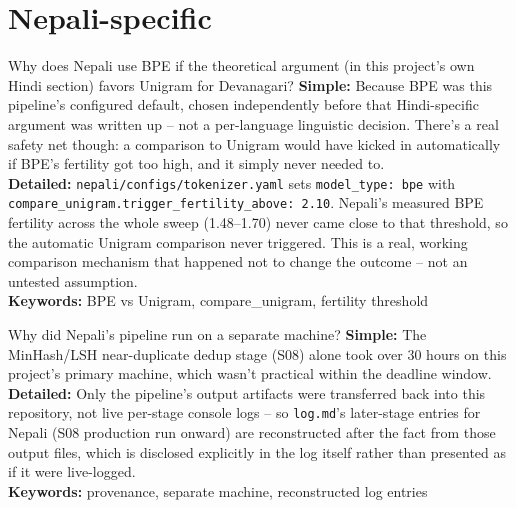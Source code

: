 \documentclass[11pt]{report}
\begin{document}
\section{Nepali-specific}

\begin{qabox}{Why does Nepali use BPE if the theoretical argument (in this
project's own Hindi section) favors Unigram for Devanagari?}
\textbf{Simple:} Because BPE was this pipeline's configured default,
chosen independently before that Hindi-specific argument was written up
-- not a per-language linguistic decision. There's a real safety net
though: a comparison to Unigram would have kicked in automatically if
BPE's fertility got too high, and it simply never needed to.\\
\textbf{Detailed:} \texttt{nepali/configs/tokenizer.yaml} sets
\texttt{model\_type: bpe} with
\texttt{compare\_unigram.trigger\_fertility\_above: 2.10}. Nepali's
measured BPE fertility across the whole sweep (1.48--1.70) never came
close to that threshold, so the automatic Unigram comparison never
triggered. This is a real, working comparison mechanism that happened not
to change the outcome -- not an untested assumption.\\
\textbf{Keywords:} BPE vs Unigram, compare\_unigram, fertility threshold
\end{qabox}

\begin{qabox}{Why did Nepali's pipeline run on a separate machine?}
\textbf{Simple:} The MinHash/LSH near-duplicate dedup stage (S08) alone
took over 30 hours on this project's primary machine, which wasn't
practical within the deadline window.\\
\textbf{Detailed:} Only the pipeline's output artifacts were transferred
back into this repository, not live per-stage console logs -- so
\texttt{log.md}'s later-stage entries for Nepali (S08 production run
onward) are reconstructed after the fact from those output files, which
is disclosed explicitly in the log itself rather than presented as if it
were live-logged.\\
\textbf{Keywords:} provenance, separate machine, reconstructed log entries
\end{qabox}
\end{document}
